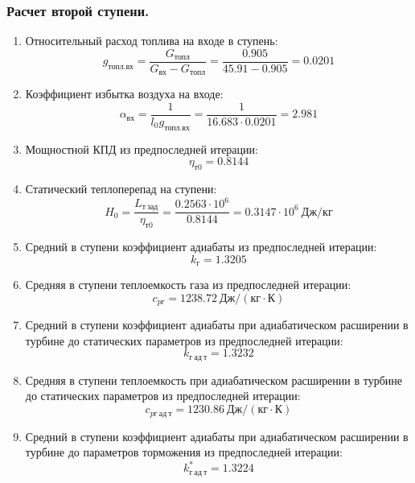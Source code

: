 \documentclass[a4paper,12pt]{article}
\begin{document}
    \subsubsection{Расчет второй ступени.}
%    

    \begin{enumerate}

        \item Относительный расход топлива на входе в ступень:
        \[
            g_{топл.вх} = \frac{ G_{топл} }{ G_{вх} - G_{топл} } =
                \frac{ 0.905 }{ 45.91 - 0.905 } =
            0.0201
        \]

        \item Коэффициент избытка воздуха на входе:
        \[
            \alpha_{вх} = \frac{ 1 }{ l_0 g_{топл.вх} } =
                \frac{ 1 }{ 16.683 \cdot 0.0201 } =
            2.981
        \]

        \item Мощностной КПД из предпоследней итерации:
        \[
            \eta_{т0} = 0.8144
        \]

        \item Статический теплоперепад на ступени:
        \[
            H_0 = \frac{L_{т\ зад}}{\eta_{т0}} =
                \frac{ 0.2563 \cdot 10^6 }{ 0.8144 } =
            0.3147 \cdot 10^6 \ Дж/кг
        \]

        \item Средний в ступени коэффициент адиабаты из предпоследней итерации:
        \[
            k_г = 1.3205
        \]

        \item Средняя в ступени теплоемкость газа из предпоследней итерации:
        \[
            c_{pг} = 1238.72 \ Дж/(кг \cdot К)
        \]

        \item Средний в ступени коэффициент адиабаты при адиабатическом расширении в турбине до статических параметров из предпоследней итерации:
        \[
            k_{г\ ад\ т} = 1.3232
        \]

        \item Средняя в ступени теплоемкость при адиабатическом расширении в турбине до статических параметров из предпоследней итерации:
        \[
            c_{pг\ ад\ т} = 1230.86 \ Дж/(кг \cdot К)
        \]

        \item Средний в ступени коэффициент адиабаты при адиабатическом расширении в турбине до параметров торможения из предпоследней итерации:
        \[
            k_{г\ ад\ т}^* = 1.3224
        \]


\end{enumerate}
\end{document}
